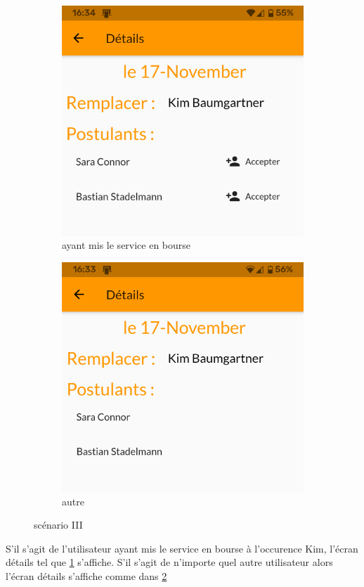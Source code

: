     \begin{figure}[!h]
        \centering
        \begin{subfigure}{.45\textwidth}
            \centering
            \includegraphics[width=0.6\linewidth]{screenshots/scenario_03/detail_auth.png}
            \caption{ayant mis le service en bourse}
            \label{fig:detail_auth}
        \end{subfigure}
        \begin{subfigure}{.45\textwidth}
            \centering
            \includegraphics[width=0.6\linewidth]{screenshots/scenario_03/detail_non_auth.png}
            \caption{autre}
            \label{fig:detail_non_auth}
        \end{subfigure}
        \caption{scénario III}
        \label{fig:scen03}
    \end{figure}

    S'il s'agit de l'utilisateur ayant mis le service en bourse à l'occurence Kim, l'écran détails tel que \ref{fig:detail_auth} s'affiche.
    S'il s'agit de n'importe quel autre utilisateur alors l'écran détails s'affiche comme dans \ref{fig:detail_non_auth}

